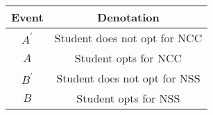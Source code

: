 \begin{tabular}[12pt]{ |c| c|} 
    \hline
    {Event} & {Denotation}\\ 
    \hline
    $A^\prime $ &  Student does not opt for NCC \\
    \hline 
    $ A $ & Student opts for NCC\\
    \hline
    $ B^\prime $ & Student does not opt for NSS\\
    \hline   
    $ B $ & Student opts for NSS \\
    \hline
\end{tabular}
